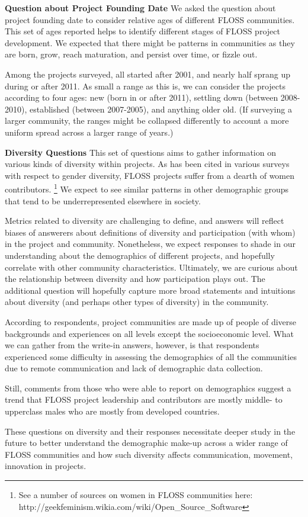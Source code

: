 
{\bf Question about Project Founding Date}
We asked the question about project founding date to consider relative ages of different FLOSS communities. This set of ages reported helps to identify different stages of FLOSS project development. We expected that there might be patterns in communities as they are born, grow, reach maturation, and persist over time, or fizzle out. 

Among the projects surveyed, all started after 2001, and nearly half sprang up during or after 2011. As small a range as this is, we can consider the projects according to four ages: new (born in or after 2011), settling down (between 2008-2010), established (between 2007-2005), and anything older old. (If surveying a larger community, the ranges might be collapsed differently to account a more uniform spread across a larger range of years.)

{\bf Diversity Questions}
This set of questions aims to gather information on various kinds of diversity within projects. As has been cited in various surveys with respect to gender diversity, FLOSS projects suffer from a dearth of women contributors. \footnote{See a number of sources on women in FLOSS communities here: http://geekfeminism.wikia.com/wiki/Open_Source_Software} We expect to see similar patterns in other demographic groups that tend to be underrepresented elsewhere in society.

Metrics related to diversity are challenging to define, and answers will reflect biases of answerers about definitions of diversity and participation (with whom) in the project and community. Nonetheless, we expect responses to shade in our understanding about the demographics of different projects, and hopefully correlate with other community characteristics. Ultimately, we are curious about the relationship between diversity and how participation plays out. The additional question will hopefully capture more broad statements and intuitions about diversity (and perhaps other types of diversity) in the community.

According to respondents, project communities are made up of people of diverse backgrounds and experiences on all levels except the socioeconomic level. What we can gather from the write-in answers, however, is that respondents experienced some difficulty in assessing the demographics of all the communities due to remote communication and lack of demographic data collection. 

Still, comments from those who were able to report on demographics suggest a trend that FLOSS project leadership and contributors are mostly middle- to upperclass males who are mostly from developed countries. 

These questions on diversity and their responses necessitate deeper study in the future to better understand the demographic make-up across a wider range of FLOSS communities and how such diversity affects communication, movement, innovation in projects. 


